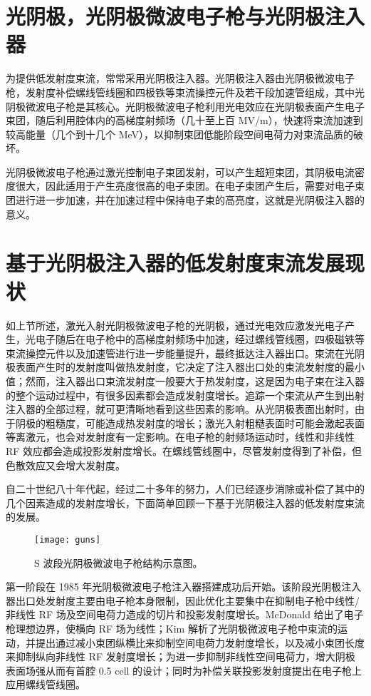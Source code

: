 \section{光阴极，光阴极微波电子枪与光阴极注入器}
为提供低发射度束流，常常采用光阴极注入器。光阴极注入器由光阴极微波电子枪，发射度补偿螺线管线圈和四极铁等束流操控元件及若干段加速管组成，其中光阴极微波电子枪是其核心。光阴极微波电子枪利用光电效应在光阴极表面产生电子束团，随后利用腔体内的高梯度射频场（几十至上百 MV/m），快速将束流加速到较高能量（几个到十几个 MeV），以抑制束团低能阶段空间电荷力对束流品质的破坏。

光阴极微波电子枪通过激光控制电子束团发射，可以产生超短束团，其阴极电流密度很大，因此适用于产生亮度很高的电子束团。在电子束团产生后，需要对电子束团进行进一步加速，并在加速过程中保持电子束的高亮度，这就是光阴极注入器的意义。

\section{基于光阴极注入器的低发射度束流发展现状}
如上节所述，激光入射光阴极微波电子枪的光阴极，通过光电效应激发光电子产生，光电子随后在电子枪中的高梯度射频场中加速，经过螺线管线圈，四极磁铁等束流操控元件以及加速管进行进一步能量提升，最终抵达注入器出口。束流在光阴极表面产生时的发射度叫做热发射度，它决定了注入器出口处的束流发射度的最小值；然而，注入器出口束流发射度一般要大于热发射度，这是因为电子束在注入器的整个运动过程中，有很多因素都会造成发射度增长。追踪一个束流从产生到出射注入器的全部过程，就可更清晰地看到这些因素的影响。从光阴极表面出射时，由于阴极的粗糙度，可能造成热发射度的增长；激光入射粗糙表面时可能会激起表面等离激元，也会对发射度有一定影响。在电子枪的射频场运动时，线性和非线性 RF 效应都会造成投影发射度增长。在螺线管线圈中，尽管发射度得到了补偿，但色散效应又会增大发射度。

自二十世纪八十年代起，经过二十多年的努力，人们已经逐步消除或补偿了其中的几个因素造成的发射度增长，下面简单回顾一下基于光阴极注入器的低发射度束流的发展。

\begin{figure}[htbp]
\centering
\texttt{[image: guns]}
\caption{\label{fig:guns} S 波段光阴极微波电子枪结构示意图\cite{Qian:2012aa}。}
\end{figure}

第一阶段在 1985 年光阴极微波电子枪注入器搭建成功\cite{Fraser:1986aa,Fraser:1987aa}后开始。该阶段光阴极注入器出口处发射度主要由电子枪本身限制，因此优化主要集中在抑制电子枪中线性/非线性 RF 场及空间电荷力造成的切片和投影发射度增长。McDonald 给出了电子枪理想边界，使横向 RF 场为线性\cite{McDonald:1988aa}；Kim 解析了光阴极微波电子枪中束流的运动，并提出通过减小束团纵横比来抑制空间电荷力发射度增长，以及减小束团长度来抑制纵向非线性 RF 发射度增长\cite{Kim:1989ab}；为进一步抑制非线性空间电荷力，增大阴极表面场强从而有首腔 0.5 cell 的设计\cite{McDonald:1988aa}；同时为补偿关联投影发射度提出在电子枪上应用螺线管线圈\cite{Carlsten:1989aa}。

